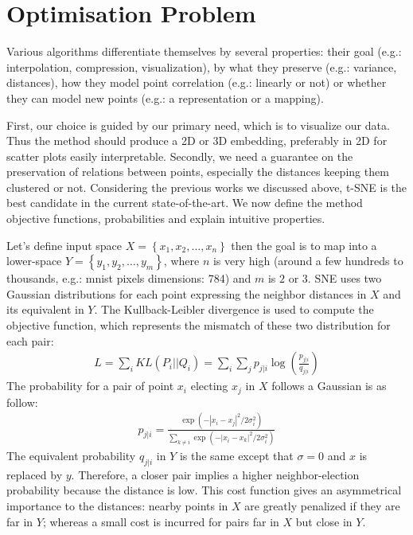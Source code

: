 \documentclass[a4paper,12pt]{report}
\newcommand{\eg}{e.g.}
\begin{document}
\section{Optimisation Problem}
Various algorithms differentiate themselves by several properties: their goal (\eg: interpolation, compression, visualization), by what they preserve (\eg: variance, distances), how they model point correlation (\eg: linearly or not) or whether they can model new points (\eg: a representation or a mapping).

First, our choice is guided by our primary need, which is to visualize our data.
Thus the method should produce a 2D or 3D embedding, preferably in 2D for scatter plots easily interpretable.
Secondly, we need a guarantee on the preservation of relations between points, especially the distances keeping them clustered or not.
Considering the previous works we discussed above, t-SNE is the best candidate in the current state-of-the-art.
We now define the method objective functions, probabilities and explain intuitive properties.

Let's define input space $X = \left\{ x_1, x_2, \dots, x_n \right\}$ then the goal is to map into a lower-space $Y = \left\{ y_1, y_2, \dots, y_m \right\}$, where $n$ is very high (around a few hundreds to thousands, \eg: mnist pixels dimensions: 784) and $m$ is $2$ or $3$.
SNE uses two Gaussian distributions for each point expressing the neighbor distances in $X$ and its equivalent in $Y$.
The Kullback-Leibler divergence is used to compute the objective function, which represents the mismatch of these two distribution for each pair:
\begin{eqnarray}
    L = \sum_i KL(P_i || Q_i) = \sum_i \sum_j p_{j|i} \log\left(\frac{p_{j|i}}{q_{j|i}}\right)
\end{eqnarray}
The probability for a pair of point $x_i$ electing $x_j$ in $X$ follows a Gaussian is as follow:
\begin{eqnarray}
    p_{j|i} = \frac{\exp(-|x_i - x_j|^2 / 2 \sigma_i^2)}{\sum_{k \not = i} \exp(-|x_i - x_k|^2 / 2 \sigma_i^2 )}
\end{eqnarray}
The equivalent probability $q_{j|i}$ in $Y$ is the same except that $\sigma = 0$ and $x$ is replaced by $y$.
Therefore, a closer pair implies a higher neighbor-election probability because the distance is low.
This cost function gives an asymmetrical importance to the distances: nearby points in $X$ are greatly penalized if they are far in $Y$; whereas a small cost is incurred for pairs far in $X$ but close in $Y$.
\end{document}
